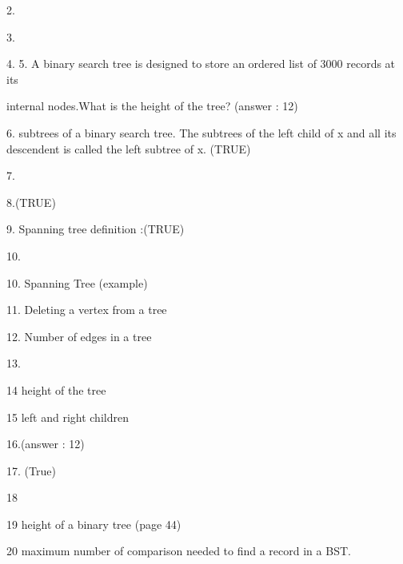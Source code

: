 

2. 

3. 

4.  5. A binary search tree is designed to store an ordered list of 3000 records at its

internal nodes.What is the height of the tree? (answer : 12)

6. subtrees of a binary search tree. The subtrees of the left child of x and all its descendent is called the left subtree of x. (TRUE)

7.  

8.(TRUE)

9.  Spanning tree definition :(TRUE)

10. 

10. Spanning Tree (example)

11. Deleting a vertex from a tree

12.  Number of edges in a tree

13.  

14 height of the tree

15 left and right children


16.(answer : 12)

17. (True)

18 

19 height of a binary tree (page 44)

20 maximum number of comparison needed to find a record in a BST. 

